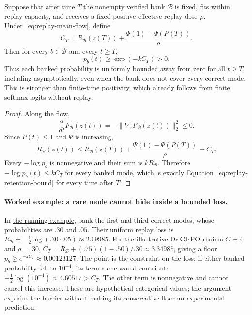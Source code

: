 \begin{theorem}
\label{thm:replay-retention}
Suppose that after time $T$ the nonempty verified bank $\mathcal B$ is fixed,
fits within replay capacity, and receives a fixed positive effective replay
dose $\rho$. Under~\eqref{eq:replay-mean-flow}, define
\[
  C_T
  =R_{\mathcal B}(z(T))
   +\frac{\Psi(1)-\Psi(P(T))}{\rho}.
\]
Then for every $b\in\mathcal B$ and every $t\ge T$,
\begin{equation}
  p_b(t)\ge \exp(-kC_T)>0.
  \label{eq:replay-retention-bound}
\end{equation}
Thus each banked probability is uniformly bounded away from zero for all
$t\ge T$, including asymptotically, even when the bank does not cover every
correct mode. This is stronger than finite-time positivity, which already
follows from finite softmax logits without replay.
\end{theorem}

\begin{proof}
Along the flow,
\[
  \frac{d}{dt}F_{\mathcal B}(z(t))
  =-\lVert\nabla_zF_{\mathcal B}(z(t))\rVert_2^2\le0.
\]
Since $P(t)\le1$ and $\Psi$ is increasing,
\[
  R_{\mathcal B}(z(t))
  \le R_{\mathcal B}(z(T))
     +\frac{\Psi(1)-\Psi(P(T))}{\rho}
  =C_T.
\]
Every $-\log p_b$ is nonnegative and their sum is
$kR_{\mathcal B}$. Therefore
$-\log p_b(t)\le kC_T$ for every banked mode, which is exactly
Equation~\eqref{eq:replay-retention-bound} for every time after $T$.
\end{proof}

\paragraph{Worked example: a rare mode cannot hide inside a bounded loss.}
In \hyperref[ex:theory-running]{the running example}, bank the first and third correct modes,
whose probabilities are $.30$ and $.05$. Their uniform replay loss is
$R_{\mathcal B}=-\tfrac12\log(.30\cdot.05)\approx2.09985$.
For the illustrative Dr.GRPO choices $G=4$ and $\rho=.30$,
$C_T=R_{\mathcal B}+(.75)(1-.50)/.30\approx3.34985$, giving a floor
$p_b\ge e^{-2C_T}\approx0.00123127$. The point is the constraint on the
loss: if either banked probability fell to $10^{-4}$, its term alone would
contribute $-\tfrac12\log(10^{-4})\approx4.60517>C_T$.
The other term is nonnegative and cannot cancel this increase. These are
hypothetical categorical values; the argument explains the barrier without
making its conservative floor an experimental prediction.


